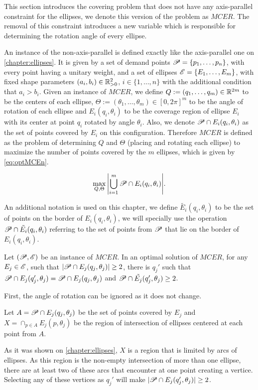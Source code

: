 This section introduces the covering problem that does not have any axis-parallel constraint for the ellipses, we denote this version of the problem as $MCER$. The removal of this constraint introduces a new variable which is responsible for determining the rotation angle of every ellipse.

An instance of the non-axis-parallel is defined exactly like the axis-parallel one on \autoref{chapter:ellipses}. It is given by a set of demand points $\mathscr{P}=\{p_1, \dots, p_n\}$, with every point having a unitary weight, and a set of ellipses $\mathscr{E}=\{E_1, \dots, E_m\}$, with fixed shape parameters $(a_i, b_i) \in \mathbb{R}^2_{>0}$, $i \in \{1, \dots, n\}$ with the additional condition that $a_i > b_i$. Given an instance of $MCER$, we define $Q:=(q_1, \dots, q_m) \in \mathbb{R}^{2m}$ to be the centers of each ellipse, $\Theta:=(\theta_1, \dots, \theta_m) \in [0, 2\pi]^m$ to be the angle of rotation of each ellipse and $E_i(q_i, \theta_i)$ to be the coverage region of ellipse $E_i$ with its center at point $q_i$ rotated by angle $\theta_i$. Also, we denote $\mathscr{P} \cap E_i(q_i, \theta_i)$ as the set of points covered by $E_i$ on this configuration. Therefore $MCER$ is defined as the problem of determining $Q$ and $\Theta$ (placing and rotating each ellipse) to maximize the number of points covered by the $m$ ellipses, which is given by \autoref{eq:optMCEn}.

\begin{equation}\label{eq:optMCEn}
\max_{Q, \Theta}{\left|\bigcup_{i=1}^{m} \mathscr{P} \cap E_i(q_i, \theta_i)\right|}.
\end{equation}

An additional notation is used on this chapter, we define $\tilde{E_i}(q_i, \theta_i)$ to be the set of points on the border of $E_i(q_i, \theta_i)$, we will specially use the operation $\mathscr{P} \cap \tilde{E_i}(q_i, \theta_i)$ referring to the set of points from $\mathscr{P}$ that lie on the border of $E_i(q_i, \theta_i)$.


\begin{lema}\label{lema:mce_2b}
	Let $(\mathscr{P}, \mathscr{E})$ be an instance of $MCER$. In an optimal solution of $MCER$, for any $E_j \in \mathscr{E}$, such that $|\mathscr{P} \cap E_j(q_j, \theta_j)|\ge2$, there is $q_j'$ such that $\mathscr{P} \cap E_j(q_j', \theta_j)=\mathscr{P} \cap E_j(q_j, \theta_j)$ and $\mathscr{P} \cap \tilde{E_j}(q_j', \theta_j) \ge 2$.
\end{lema}

\begin{demonstracao}
	First, the angle of rotation can be ignored as it does not change.
	
	Let $A=\mathscr{P} \cap E_j(q_j, \theta_j)$ be the set of points covered by $E_j$ and $X=\cap_{p \in A}E_j(p, \theta_j)$ be the region of intersection of ellipses centered at each point from $A$.
	
	As it was shown on \autoref{chapter:ellipses}, $X$ is a region that is limited by arcs of ellipses. As this region is the non-empty intersection of more than one ellipse, there are at least two of these arcs that encounter at one point creating a vertice. Selecting any of these vertices as $q_j'$ will make $|\mathscr{P} \cap E_j(q_j', \theta_j)| \ge 2$.
	
	
\end{demonstracao}

